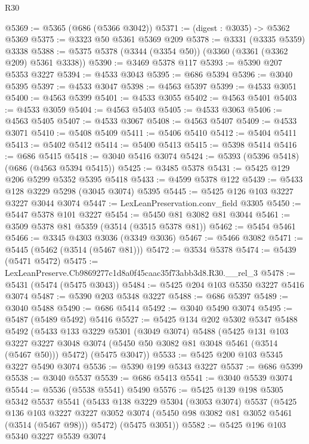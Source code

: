 \begin{lexlean}{R30}
\begin{coremodule}
@5369 := @5365 (@686 (@5366 @3042))
@5371 := (digest : @3035) -> @5362 @5369
@5375 := @3323 @50 @5361 @5369 @209
@5378 := @3331 (@3335 @5359) @3338
@5388 := @5375 @5378 (@3344 (@3354 @50)) (@3360 (@3361 (@3362 @209) @5361 @3338))
@5390 := @3469 @5378 @117
@5393 := @5390 @207 @5353 @3227
@5394 := @4533 @3043
@5395 := @686 @5394
@5396 := @3040 @5395
@5397 := @4533 @3047
@5398 := @4563 @5397
@5399 := @4533 @3051
@5400 := @4563 @5399
@5401 := @4533 @3055
@5402 := @4563 @5401
@5403 := @4533 @3059
@5404 := @4563 @5403
@5405 := @4533 @3063
@5406 := @4563 @5405
@5407 := @4533 @3067
@5408 := @4563 @5407
@5409 := @4533 @3071
@5410 := @5408 @5409
@5411 := @5406 @5410
@5412 := @5404 @5411
@5413 := @5402 @5412
@5414 := @5400 @5413
@5415 := @5398 @5414
@5416 := @686 @5415
@5418 := @3040 @5416 @3074
@5424 := @5393 (@5396 @5418) (@686 (@4563 @5394 @5415))
@5425 := @3485 @5378
@5431 := @5425 @129 @206 @5299 @5352 @5395 @5418
@5433 := @4599 @5378 @122
@5439 := @5433 @128 @3229 @5298 (@3045 @3074) @5395
@5445 := @5425 @126 @103 @3227 @3227 @3044 @3074
@5447 := LexLeanPreservation.conv_field @3305
@5450 := @5447 @5378 @101 @3227
@5454 := @5450 @81 @3082 @81 @3044
@5461 := @3509 @5378 @81 @5359 (@3514 (@3515 @5378 @81))
@5462 := @5454 @5461
@5466 := @3345 @4303 @3036 (@3349 @3036)
@5467 := @5466 @3082
@5471 := @5445 (@5462 (@3514 (@5467 @81)))
@5472 := @3534 @5378
@5474 := @5439 (@5471 @5472)
@5475 := LexLeanPreserve.Cb9869277c1d8a0f45caac35f73abb3d8.R30.__rel_3
@5478 := @5431 (@5474 (@5475 @3043))
@5484 := @5425 @204 @103 @5350 @3227 @5416 @3074
@5487 := @5390 @203 @5348 @3227
@5488 := @686 @5397
@5489 := @3040 @5488
@5490 := @686 @5414
@5492 := @3040 @5490 @3074
@5495 := @5487 (@5489 @5492) @5416
@5527 := @5425
    @134
    @202
    @5302
    @5347
    @5488
    @5492
    (@5433
      @133
      @3229
      @5301
      (@3049 @3074)
      @5488
      (@5425
        @131
        @103
        @3227
        @3227
        @3048
        @3074
        (@5450 @50 @3082 @81 @3048 @5461 (@3514 (@5467 @50)))
        @5472)
      (@5475 @3047))
@5533 := @5425 @200 @103 @5345 @3227 @5490 @3074
@5536 := @5390 @199 @5343 @3227
@5537 := @686 @5399
@5538 := @3040 @5537
@5539 := @686 @5413
@5541 := @3040 @5539 @3074
@5544 := @5536 (@5538 @5541) @5490
@5576 := @5425
    @139
    @198
    @5305
    @5342
    @5537
    @5541
    (@5433
      @138
      @3229
      @5304
      (@3053 @3074)
      @5537
      (@5425
        @136
        @103
        @3227
        @3227
        @3052
        @3074
        (@5450 @98 @3082 @81 @3052 @5461 (@3514 (@5467 @98)))
        @5472)
      (@5475 @3051))
@5582 := @5425 @196 @103 @5340 @3227 @5539 @3074

\end{coremodule}
\end{lexlean}
